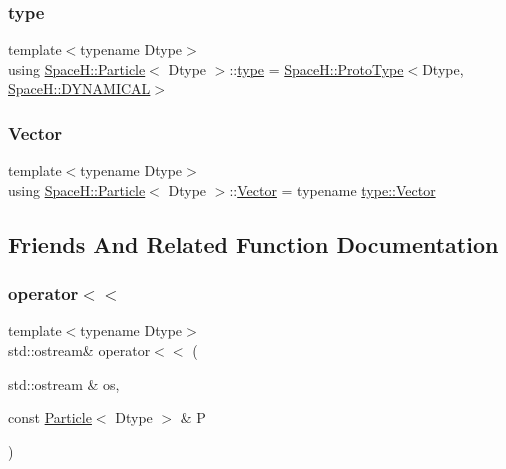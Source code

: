 \mbox{\label{struct_space_h_1_1_particle_a4da7db09bcfc01d24c63468e6e08fa24}} 
\subsubsection{\texorpdfstring{type}{type}}
{\footnotesize\ttfamily template$<$typename Dtype$>$ \\
using \mbox{\hyperlink{struct_space_h_1_1_particle}{Space\+H\+::\+Particle}}$<$ Dtype $>$\+::\mbox{\hyperlink{struct_space_h_1_1_particle_a4da7db09bcfc01d24c63468e6e08fa24}{type}} =  \mbox{\hyperlink{struct_space_h_1_1_proto_type}{Space\+H\+::\+Proto\+Type}}$<$Dtype, \mbox{\hyperlink{namespace_space_h_a3e55b9bc2a9e10c08ce8121bce11244a}{Space\+H\+::\+D\+Y\+N\+A\+M\+I\+C\+AL}}$>$}

\mbox{\label{struct_space_h_1_1_particle_afba20bb4c28d27263de384ba6a18f5c3}} 
\subsubsection{\texorpdfstring{Vector}{Vector}}
{\footnotesize\ttfamily template$<$typename Dtype$>$ \\
using \mbox{\hyperlink{struct_space_h_1_1_particle}{Space\+H\+::\+Particle}}$<$ Dtype $>$\+::\mbox{\hyperlink{struct_space_h_1_1_particle_afba20bb4c28d27263de384ba6a18f5c3}{Vector}} =  typename \mbox{\hyperlink{struct_space_h_1_1_proto_type_a316b81f4660b2b4fab14a8e1f23b6089}{type\+::\+Vector}}}



\subsection{Friends And Related Function Documentation}
\mbox{\label{struct_space_h_1_1_particle_a2a1242332e0e6ddcf12e64645823d7c8}} 
\subsubsection{\texorpdfstring{operator$<$$<$}{operator<<}}
{\footnotesize\ttfamily template$<$typename Dtype$>$ \\
std\+::ostream\& operator$<$$<$ (\begin{DoxyParamCaption}\item[{std\+::ostream \&}]{os,  }\item[{const \mbox{\hyperlink{struct_space_h_1_1_particle}{Particle}}$<$ Dtype $>$ \&}]{P }\end{DoxyParamCaption})\hspace{0.3cm}{\ttfamily [friend]}}




